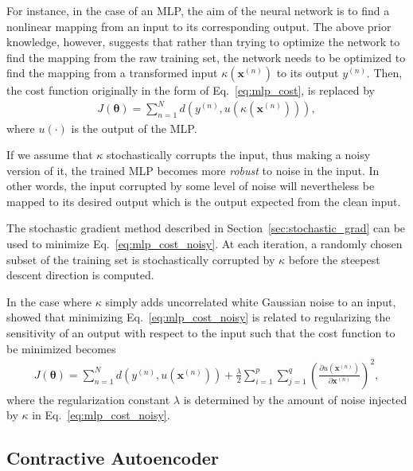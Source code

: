 \documentclass[dissertation,nocontribution]{aaltoseries}
\newcommand{\vect}[1]{\mathbf{#1}}
\newcommand{\vects}[1]{\boldsymbol{#1}}
\newcommand{\vx}[0]{\vect{x}}
\newcommand{\TT}[0]{{\vects{\theta}}}
\begin{document}
For instance, in the case of an MLP, the aim of the neural
network is to find a nonlinear mapping from an input to its
corresponding output. The above prior knowledge, however,
suggests that rather than trying to optimize the network to
find the mapping from the raw training set, the network
needs to be optimized to find the mapping from a transformed
input $\kappa(\vx^{(n)})$ to its output $y^{(n)}$. Then, the
cost function originally in the form of
Eq.~\eqref{eq:mlp_cost}, is replaced by
\begin{align}
    \label{eq:mlp_cost_noisy}
    J(\TT) = \sum_{n=1}^N d\left(y^{(n)},
    u(\kappa(\vx^{(n)}))\right),
\end{align}
where $u(\cdot)$ is the output of the MLP.

If we assume that $\kappa$ stochastically corrupts the
input,
thus making a noisy version of it, the trained MLP becomes
more \textit{robust} to noise in the input. In other words,
the input corrupted by some level of noise will nevertheless
be mapped to its desired output which is the output expected
from the clean input. 

The stochastic gradient method
described in Section~\ref{sec:stochastic_grad} can be used to minimize
Eq.~\eqref{eq:mlp_cost_noisy}. At each iteration, a randomly
chosen subset of the training set is stochastically
corrupted by $\kappa$ before the steepest descent direction
is computed. 

In the case where $\kappa$ simply adds uncorrelated white
Gaussian noise to an input, \citet{Bishop1995} showed that
minimizing Eq.~\eqref{eq:mlp_cost_noisy} is related to
regularizing the sensitivity of an output with respect to
the input such that the cost function to be minimized
becomes
\begin{align}
    \label{eq:noise_injection_reg}
    J(\TT) = \sum_{n=1}^N d\left(y^{(n)},
    u(\vx^{(n)})\right) + \frac{\lambda}{2}
    \sum_{i=1}^p \sum_{j=1}^q \left( \frac{\partial
    u(\vx^{(n)})}{\partial \vx^{(n)}}\right)^2,
\end{align}
where the regularization constant $\lambda$ is determined by
the amount of noise injected by $\kappa$ in
Eq.~\eqref{eq:mlp_cost_noisy}.

\subsection{Contractive Autoencoder}
\end{document}
